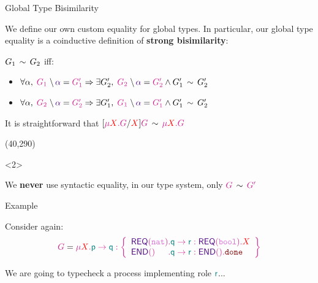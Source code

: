 \begin{frame}{Global Type Bisimilarity}

  We define our own custom equality for global types. In particular, our global  type equality is a coinductive definition of \textbf{strong bisimilarity}:

  \vspace{.4cm}

  $G_{1} \mathrel{\,\sim\,} G_{2}$ iff:
  \begin{itemize}
          \item $\forall \alpha, \; \greduce{G_{1}}{\alpha}{G_{1}'} \Rightarrow \exists {G_{2}'}, \; \greduce{G_{2}}{\alpha}{G_{2}'} \wedge G_{1}' \bisim G_{2}'$
          \item $\forall \alpha, \; \greduce{G_{2}}{\alpha}{G_{2}'} \Rightarrow \exists {G_{1}'}, \; \greduce{G_{1}}{\alpha}{G_{1}'} \wedge G_{1}' \bisim G_{2}'$
  \end{itemize}

  \vspace{.4cm}
  It is straightforward that $[\grecur X G / \pvar{X}] \globalt{G} \bisim \grecur X G$

  \Put(40,290){%
    \begin{onlyenv}<2>
    \begin{minipage}{.86\columnwidth}
    \begin{greenbox}
      \Huge
      We \textbf{never} use syntactic equality, in our type system, only $\globalt{G} \bisim \globalt{G'}$
    \end{greenbox}
    \end{minipage}
    \end{onlyenv}
  }

\end{frame}

\begin{frame}{Example}

  Consider again:
  \begin{displaymath}
    \globalt{G} = \grecur X {
\gmsg \Rp \Rq {\left\{%
  \begin{array}{l@{}l}
   \dlbl{\mathsf{REQ}}(\snat) &. \gmsg \Rq \Rr {\dlbl{\mathsf{REQ}}(\sbool). \pvar{X}} \\
   \dlbl{\mathsf{END}}() &. \gmsg \Rq \Rr {\dlbl{\mathsf{END}}(). \pfinish}
  \end{array}
   \right\}}}
  \end{displaymath}

  We are going to typecheck a process implementing role $\Rr$...

\end{frame}

